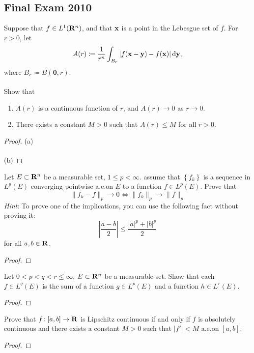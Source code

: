 \subsection{Final Exam 2010}
\begin{problem}
Suppose that $f\in L^1(\mathbf{R}^n)$, and that $\mathbf{x}$ is a point in the Lebesgue
set of $f$. For $r>0$, let
\[
A(r)\coloneqq \frac{1}{r^n}\int_{B_r}|f(\mathbf{x}-\mathbf{y})-f(\mathbf{x})|\mathop{}\!\mathrm{d}\mathbf{y},
\]
where $B_r\coloneqq B(\mathbf{0},r)$.
\\\\
Show that
\begin{enumerate}[label=(\alph*)]
\item $A(r)$ is a continuous function of $r$, and $A(r)\to 0$ as $r\to 0$.
\item There exists a constant $M>0$ such that $A(r)\leq M$ for all $r>0$.
\end{enumerate}
\end{problem}
\begin{proof}
(a)
\\\\
(b)
\end{proof}

\begin{problem}
Let $E\subset\mathbf{R}^n$ be a measurable set, $1\leq p<\infty$. assume that
$\left\{ f_k \right\}$ is a sequence in $L^p(E)$ converging pointwise
a.e.\@ on $E$ to a function $f\in L^p(E)$. Prove that
\[
\|f_k-f\|_p\longrightarrow 0\iff
\|f_k\|_p\longrightarrow\|f\|_p
\]
\emph{Hint}: To prove one of the implications, you can use the following
fact without proving it:
\[
\left|
\frac{a-b}{2}
\right|
\leq
\frac{|a|^p+|b|^p}{2}
\]
for all $a,b\in\mathbf{R}$.
\end{problem}
\begin{proof}
\end{proof}

\begin{problem}
Let $0<p<q<r\leq\infty$, $E\subset\mathbf{R}^n$ be a measurable set. Show that
each $f\in L^q(E)$ is the sum of a function $g\in L^p(E)$ and a function
$h\in L^r(E)$.
\end{problem}
\begin{proof}
\end{proof}

\begin{problem}
Prove that $f\colon[a,b]\to\mathbf{R}$ is Lipschitz continuous if and only if $f$
is absolutely continuous and there exists a constant $M>0$ such that
$|f'|<M$ a.e.\@ on $[a,b]$.
\end{problem}
\begin{proof}
\end{proof}

